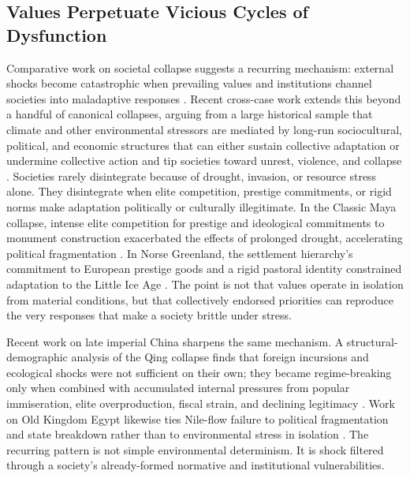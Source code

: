 \documentclass{article}
\theoremstyle{plain}
\theoremstyle{definition}
\theoremstyle{remark}
\begin{document}
\subsection{Values Perpetuate Vicious Cycles of Dysfunction}
Comparative work on societal collapse suggests a recurring mechanism: external shocks become catastrophic when prevailing values and institutions channel societies into maladaptive responses \citep{diamond2011collapse}. Recent cross-case work extends this beyond a handful of canonical collapses, arguing from a large historical sample that climate and other environmental stressors are mediated by long-run sociocultural, political, and economic structures that can either sustain collective adaptation or undermine collective action and tip societies toward unrest, violence, and collapse \citep{hoyer2023polycrisis}. Societies rarely disintegrate because of drought, invasion, or resource stress alone. They disintegrate when elite competition, prestige commitments, or rigid norms make adaptation politically or culturally illegitimate. In the Classic Maya collapse, intense elite competition for prestige and ideological commitments to monument construction exacerbated the effects of prolonged drought, accelerating political fragmentation \citep{demarest2004ancient}. In Norse Greenland, the settlement hierarchy's commitment to European prestige goods and a rigid pastoral identity constrained adaptation to the Little Ice Age \citep{dugmore2012cultural, mcgovern2000demise}. The point is not that values operate in isolation from material conditions, but that collectively endorsed priorities can reproduce the very responses that make a society brittle under stress.

Recent work on late imperial China sharpens the same mechanism. A structural-demographic analysis of the Qing collapse finds that foreign incursions and ecological shocks were not sufficient on their own; they became regime-breaking only when combined with accumulated internal pressures from popular immiseration, elite overproduction, fiscal strain, and declining legitimacy \citep{goldstone2017demographic, orlandi2023qing}. Work on Old Kingdom Egypt likewise ties Nile-flow failure to political fragmentation and state breakdown rather than to environmental stress in isolation \citep{stanley2003nile}. The recurring pattern is not simple environmental determinism. It is shock filtered through a society's already-formed normative and institutional vulnerabilities.
\end{document}
